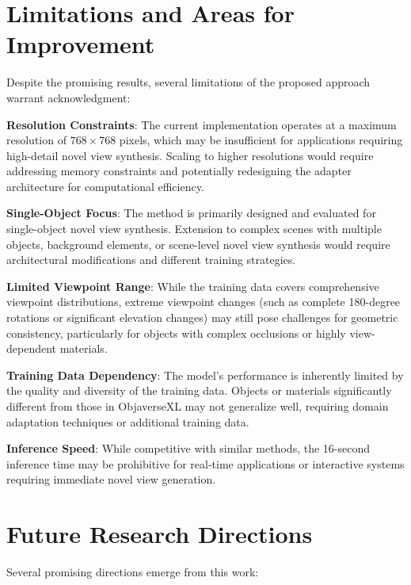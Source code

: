 \section{Limitations and Areas for Improvement}

Despite the promising results, several limitations of the proposed approach warrant acknowledgment:

\textbf{Resolution Constraints}: The current implementation operates at a maximum resolution of $768 \times 768$ pixels, which may be insufficient for applications requiring high-detail novel view synthesis. Scaling to higher resolutions would require addressing memory constraints and potentially redesigning the adapter architecture for computational efficiency.

\textbf{Single-Object Focus}: The method is primarily designed and evaluated for single-object novel view synthesis. Extension to complex scenes with multiple objects, background elements, or scene-level novel view synthesis would require architectural modifications and different training strategies.

\textbf{Limited Viewpoint Range}: While the training data covers comprehensive viewpoint distributions, extreme viewpoint changes (such as complete 180-degree rotations or significant elevation changes) may still pose challenges for geometric consistency, particularly for objects with complex occlusions or highly view-dependent materials.

\textbf{Training Data Dependency}: The model's performance is inherently limited by the quality and diversity of the training data. Objects or materials significantly different from those in ObjaverseXL may not generalize well, requiring domain adaptation techniques or additional training data.

\textbf{Inference Speed}: While competitive with similar methods, the 16-second inference time may be prohibitive for real-time applications or interactive systems requiring immediate novel view generation.

\section{Future Research Directions}

Several promising directions emerge from this work:

